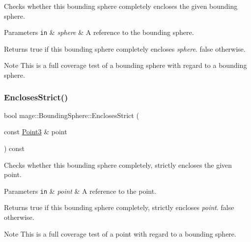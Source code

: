 Checks whether this bounding sphere completely encloses the given bounding sphere.


\begin{DoxyParams}[1]{Parameters}
\mbox{\tt in}  & {\em sphere} & A reference to the bounding sphere. \\
\hline
\end{DoxyParams}
\begin{DoxyReturn}{Returns}
{\ttfamily true} if this bounding sphere completely encloses {\itshape sphere}. {\ttfamily false} otherwise. 
\end{DoxyReturn}
\begin{DoxyNote}{Note}
This is a full coverage test of a bounding sphere with regard to a bounding sphere. 
\end{DoxyNote}
\hypertarget{classmage_1_1_bounding_sphere_a749a8fa3317e5490c12b049e68f7d502}{}\label{classmage_1_1_bounding_sphere_a749a8fa3317e5490c12b049e68f7d502} 
\subsubsection{\texorpdfstring{Encloses\+Strict()}{EnclosesStrict()}\hspace{0.1cm}{\footnotesize\ttfamily [1/4]}}
{\footnotesize\ttfamily bool mage\+::\+Bounding\+Sphere\+::\+Encloses\+Strict (\begin{DoxyParamCaption}\item[{const \hyperlink{structmage_1_1_point3}{Point3} \&}]{point }\end{DoxyParamCaption}) const\hspace{0.3cm}{\ttfamily [noexcept]}}

Checks whether this bounding sphere completely, strictly encloses the given point.


\begin{DoxyParams}[1]{Parameters}
\mbox{\tt in}  & {\em point} & A reference to the point. \\
\hline
\end{DoxyParams}
\begin{DoxyReturn}{Returns}
{\ttfamily true} if this bounding sphere completely, strictly encloses {\itshape point}. {\ttfamily false} otherwise. 
\end{DoxyReturn}
\begin{DoxyNote}{Note}
This is a full coverage test of a point with regard to a bounding sphere. 
\end{DoxyNote}
\hypertarget{classmage_1_1_bounding_sphere_ad75f41a261dd2e366457543b6150718a}{}\label{classmage_1_1_bounding_sphere_ad75f41a261dd2e366457543b6150718a} 
